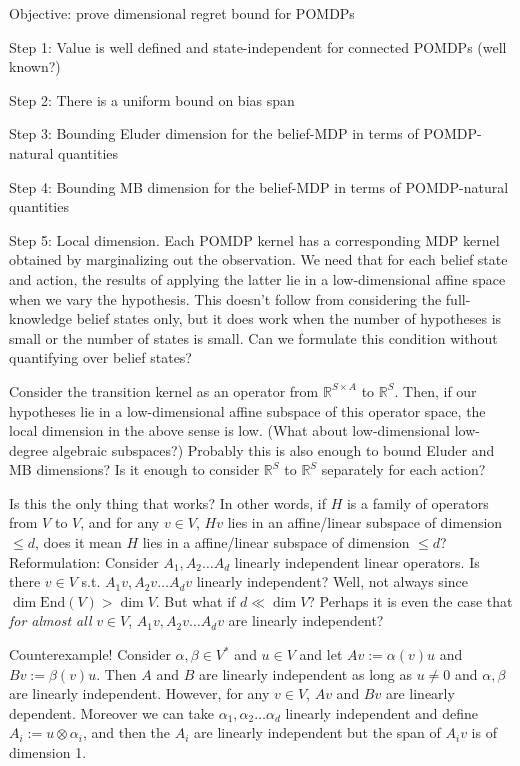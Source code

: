\documentclass[a4paper]{article}
\newcommand{\Reals}{\mathbb{R}}
\newcommand{\End}{\mathrm{End}}
\begin{document}
Objective: prove dimensional regret bound for POMDPs

Step 1: Value is well defined and state-independent for connected POMDPs (well known?)

Step 2: There is a uniform bound on bias span

Step 3: Bounding Eluder dimension for the belief-MDP in terms of POMDP-natural quantities

Step 4: Bounding MB dimension for the belief-MDP in terms of POMDP-natural quantities

Step 5: Local dimension. Each POMDP kernel has a corresponding MDP kernel obtained by marginalizing out the observation. We need that for each belief state and action, the results of applying the latter lie in a low-dimensional affine space when we vary the hypothesis. This doesn't follow from considering the full-knowledge belief states only, but it does work when the number of hypotheses is small or the number of states is small. Can we formulate this condition without quantifying over belief states?

Consider the transition kernel as an operator from $\Reals^{S\times A}$ to $\Reals^S$. Then, if our hypotheses lie in a low-dimensional affine subspace of this operator space, the local dimension in the above sense is low. (What about low-dimensional low-degree algebraic subspaces?) Probably this is also enough to bound Eluder and MB dimensions? Is it enough to consider $\Reals^{S}$ to $\Reals^S$ separately for each action?

Is this the only thing that works? In other words, if $H$ is a family of operators from $V$ to $V$, and for any $v\in V$, $Hv$ lies in an affine/linear subspace of dimension $\leq d$, does it mean $H$ lies in a affine/linear subspace of dimension $\leq d$? Reformulation: Consider $A_1, A_2 \ldots A_d$ linearly independent linear operators. Is there $v\in V$ s.t. $A_1v, A_2v\ldots A_d v$ linearly independent? Well, not always since $\dim\End(V) > \dim V$. But what if $d\ll\dim V$? Perhaps it is even the case that \textit{for almost all} $v\in V$, $A_1v, A_2v\ldots A_d v$ are linearly independent?

Counterexample! Consider $\alpha,\beta\in V^*$ and $u\in V$ and let $Av:=\alpha(v)u$ and $Bv:=\beta(v)u$. Then $A$ and $B$ are linearly independent as long as $u\ne0$ and $\alpha,\beta$ are linearly independent. However, for any $v\in V$, $Av$ and $Bv$ are linearly dependent. Moreover we can take $\alpha_1,\alpha_2\ldots\alpha_d$ linearly independent and define $A_i:=u\otimes\alpha_i$, and then the $A_i$ are linearly independent but the span of $A_i v$ is of dimension 1.
\end{document}
